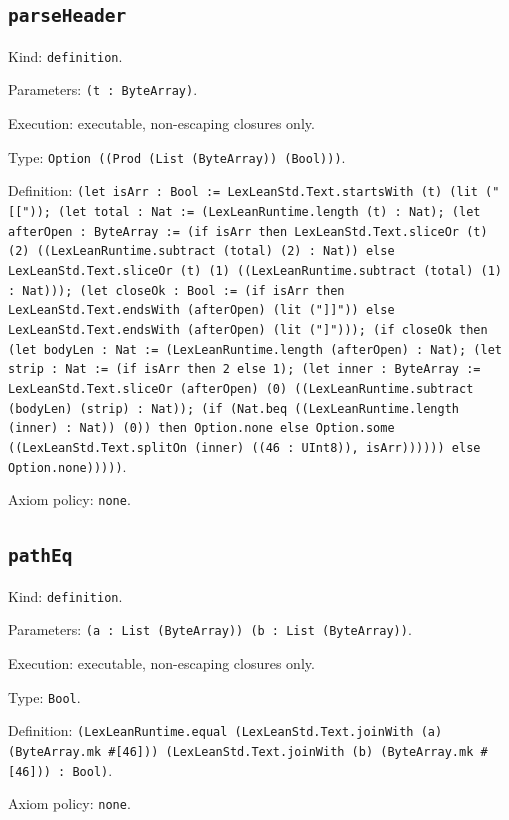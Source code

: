 \documentclass[11pt]{article}
\begin{document}
\subsection*{\texttt{parseHeader}}
\noindent Kind: \texttt{definition}.\par
\noindent Parameters: \texttt{(t : ByteArray)}.\par
\noindent Execution: executable, non-escaping closures only.\par
\noindent Type: \texttt{Option ((Prod (List (ByteArray)) (Bool)))}.\par
\noindent Definition: \texttt{(let isArr : Bool := LexLeanStd.Text.startsWith (t) (lit ("[[")); (let total : Nat := (LexLeanRuntime.length (t) : Nat); (let afterOpen : ByteArray := (if isArr then LexLeanStd.Text.sliceOr (t) (2) ((LexLeanRuntime.subtract (total) (2) : Nat)) else LexLeanStd.Text.sliceOr (t) (1) ((LexLeanRuntime.subtract (total) (1) : Nat))); (let closeOk : Bool := (if isArr then LexLeanStd.Text.endsWith (afterOpen) (lit ("]]")) else LexLeanStd.Text.endsWith (afterOpen) (lit ("]"))); (if closeOk then (let bodyLen : Nat := (LexLeanRuntime.length (afterOpen) : Nat); (let strip : Nat := (if isArr then 2 else 1); (let inner : ByteArray := LexLeanStd.Text.sliceOr (afterOpen) (0) ((LexLeanRuntime.subtract (bodyLen) (strip) : Nat)); (if (Nat.beq ((LexLeanRuntime.length (inner) : Nat)) (0)) then Option.none else Option.some ((LexLeanStd.Text.splitOn (inner) ((46 : UInt8)), isArr)))))) else Option.none)))))}.\par
\noindent Axiom policy: \texttt{none}.\par
\subsection*{\texttt{pathEq}}
\noindent Kind: \texttt{definition}.\par
\noindent Parameters: \texttt{(a : List (ByteArray)) (b : List (ByteArray))}.\par
\noindent Execution: executable, non-escaping closures only.\par
\noindent Type: \texttt{Bool}.\par
\noindent Definition: \texttt{(LexLeanRuntime.equal (LexLeanStd.Text.joinWith (a) (ByteArray.mk \#[46])) (LexLeanStd.Text.joinWith (b) (ByteArray.mk \#[46])) : Bool)}.\par
\noindent Axiom policy: \texttt{none}.\par
\end{document}
